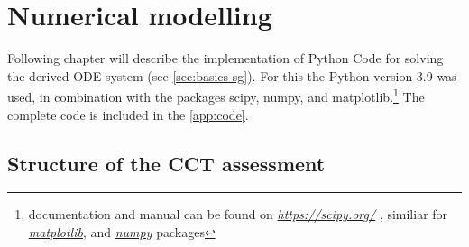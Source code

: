 \chapter{Numerical modelling}
\label{chap:methods}

Following chapter will describe the implementation of Python Code for solving the derived \acs{ODE} system (see \autoref{sec:basics-sg}). For this the Python version 3.9 was used, in combination with the packages scipy, numpy, and matplotlib.\footnote{documentation and manual can be found on \href{https://scipy.org/}{\itshape https://scipy.org/} \autocite{virtanenSciPyFundamentalAlgorithms2020}, similiar for \href{https://matplotlib.org/}{\itshape matplotlib}, and \href{https://numpy.org/}{\itshape numpy} packages} The complete code is included in the \autoref{app:code}. %

\section{Structure of the \acs{CCT} assessment}

